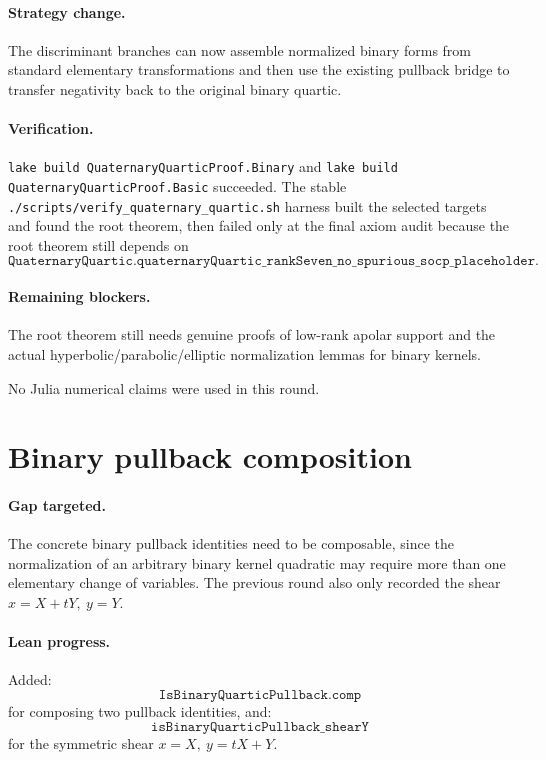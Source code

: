 \documentclass[11pt]{article}
\begin{document}
\paragraph{Strategy change.}
The discriminant branches can now assemble normalized binary forms from
standard elementary transformations and then use the existing pullback bridge
to transfer negativity back to the original binary quartic.

\paragraph{Verification.}
\texttt{lake build QuaternaryQuarticProof.Binary} and
\texttt{lake build QuaternaryQuarticProof.Basic} succeeded.  The stable
\texttt{./scripts/verify\_quaternary\_quartic.sh} harness built the selected
targets and found the root theorem, then failed only at the final axiom audit
because the root theorem still depends on
\[
\texttt{QuaternaryQuartic.quaternaryQuartic\_rankSeven\_no\_spurious\_socp\_placeholder}.
\]

\paragraph{Remaining blockers.}
The root theorem still needs genuine proofs of low-rank apolar support and the
actual hyperbolic/parabolic/elliptic normalization lemmas for binary kernels.

No Julia numerical claims were used in this round.

\section*{Binary pullback composition}

\paragraph{Gap targeted.}
The concrete binary pullback identities need to be composable, since the
normalization of an arbitrary binary kernel quadratic may require more than one
elementary change of variables.  The previous round also only recorded the
shear \(x=X+tY,\ y=Y\).

\paragraph{Lean progress.}
Added:
\[
\texttt{IsBinaryQuarticPullback.comp}
\]
for composing two pullback identities, and:
\[
\texttt{isBinaryQuarticPullback\_shearY}
\]
for the symmetric shear \(x=X,\ y=tX+Y\).
\end{document}
